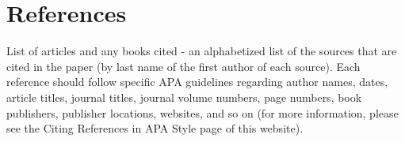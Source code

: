 \documentclass[12pt]{article}
\begin{document}
\section*{References}
List of articles and any books cited - an alphabetized list of the sources that are cited in the paper (by last name of the first author of each source).  Each reference should follow specific APA guidelines regarding author names, dates, article titles, journal titles, journal volume numbers, page numbers, book publishers, publisher locations, websites, and so on (for more information, please see the Citing References in APA Style page of this website).
\end{document}
